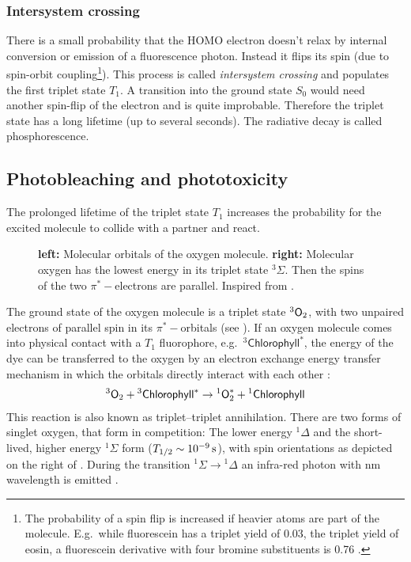\subsubsection{Intersystem crossing}
There is a small probability that the HOMO electron doesn't relax by
internal conversion or emission of a fluorescence photon. Instead it
flips its spin (due to spin-orbit coupling\footnote{The probability of
  a spin flip is increased if heavier atoms are part of the
  molecule. E.g.\ while fluorescein has a triplet yield of 0.03, the
  triplet yield of eosin, a fluorescein derivative with four bromine
  substituents is 0.76 \citep[p.~37]{Sauer2011}.}). This process is
called \emph{intersystem crossing} and populates the first triplet
state $T_1$. A transition into the ground state $S_0$ would need
another spin-flip of the electron and is quite improbable. Therefore
the triplet state has a long lifetime (up to several seconds). The
radiative decay is called phosphorescence.
  

\subsection{Photobleaching and phototoxicity}
The prolonged lifetime of the triplet state $T_1$ increases the
probability for the excited molecule to collide with a partner and
react.

\begin{figure}[!hbt]
  \centering
  
  \caption{{\bf left:} Molecular orbitals of the oxygen molecule. {\bf
      right:} Molecular oxygen has the lowest energy in its triplet
    state ${}^3\Sigma$. Then the spins of the two $\pi^*-$electrons
    are parallel. Inspired from \citep{Linde2011a}.}
  \label{fig:oxygen}
\end{figure}


The ground state of the oxygen molecule is a triplet state ${}^3\textsf{O}_2$,
with two unpaired electrons of parallel spin in its $\pi^*-$orbitals
(see ).  If an oxygen molecule comes into physical
contact with a $T_1$ fluorophore, e.g.\ ${}^3\textsf{Chlorophyll}^*$,
the energy of the dye can be transferred to the oxygen by an electron
exchange energy transfer mechanism in which the orbitals directly
interact with each other \citetext{\citealp[p.~438]{Haken2006} and
  \citealp{Linde2011a}}:
\begin{align}
  {}^3\textsf{O}_2 + {}^3\textsf{Chlorophyll}^* \rightarrow
  {}^1\textsf{O}^*_2+{}^1\textsf{Chlorophyll}
\end{align}
This reaction is also known as triplet--triplet annihilation.  There
are two forms of singlet oxygen, that form in competition: The lower
energy ${}^1\Delta$ and the short-lived, higher energy ${}^1\Sigma$
form ($T_{1/2}\sim\unit[10^{-9}]{s}$), with spin orientations as
depicted on the right of . During the transition
${}^1\Sigma\rightarrow{}^1\Delta$ an infra-red photon with
\unit[1268]{nm} wavelength is emitted \citep[p.~20]{Linde2011a}.


